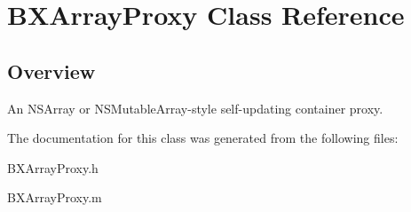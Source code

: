 \hypertarget{interface_b_x_array_proxy}{}\section{B\+X\+Array\+Proxy Class Reference}
\label{interface_b_x_array_proxy}


\subsection{Overview}
An N\+S\+Array or N\+S\+Mutable\+Array-\/style self-\/updating container proxy. 

The documentation for this class was generated from the following files\+:\begin{DoxyCompactItemize}
\item 
B\+X\+Array\+Proxy.\+h\item 
B\+X\+Array\+Proxy.\+m\end{DoxyCompactItemize}

